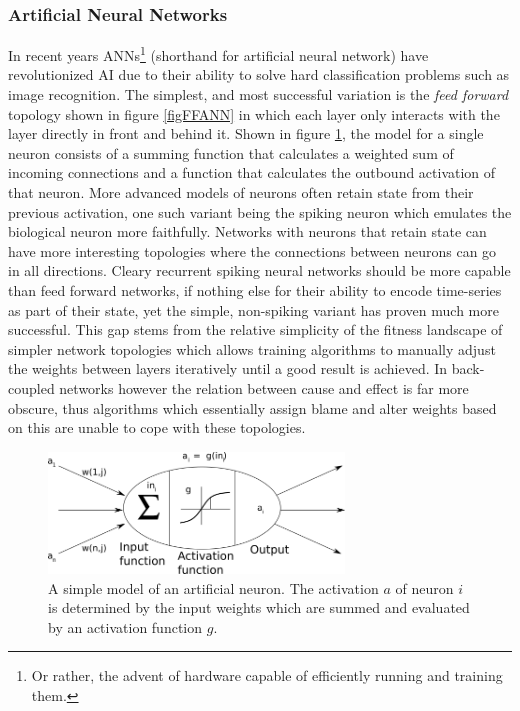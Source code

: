 \subsubsection{Artificial Neural Networks}
In recent years ANNs\footnote{Or rather, the advent of hardware capable of
  efficiently running and training them.} (shorthand for artificial neural
network) have revolutionized AI due to their ability to solve hard
classification problems such as image recognition.
The simplest, and most successful variation is the \emph{feed forward} topology
shown in figure \ref{figFFANN} in which each layer only interacts with the layer
directly in front and behind it.
Shown in figure \ref{figNeuronModel}, the model for a single neuron consists of a
summing function that calculates a weighted sum of incoming connections and a
function that calculates the outbound activation of that neuron.
More advanced models of neurons often retain state from their previous
activation, one such variant being the spiking neuron which emulates the
biological neuron more faithfully.
Networks with neurons that retain state can have more interesting topologies
where the connections between neurons can go in all directions.
Cleary recurrent spiking neural networks should be more capable than feed
forward networks, if nothing else for their ability to encode time-series as
part of their state, yet the simple, non-spiking variant has proven much more
successful.
This gap stems from the relative simplicity of the fitness landscape of simpler
network topologies which allows training algorithms to manually adjust the
weights between layers iteratively until a good result is achieved.
In back-coupled networks however the relation between cause and effect is far
more obscure, thus algorithms which essentially assign blame and alter weights
based on this are unable to cope with these topologies.
\begin{figure}[h!]
  \centering
  \includegraphics[width=0.7\textwidth]{fig/ArtificialNeuron.png}
  \caption[An artificial neuron]{
    A simple model of an artificial neuron.
    The activation $a$ of neuron $i$ is determined by the input weights which
    are summed and evaluated by an activation function $g$.
  }
  \label{figNeuronModel}
\end{figure}
